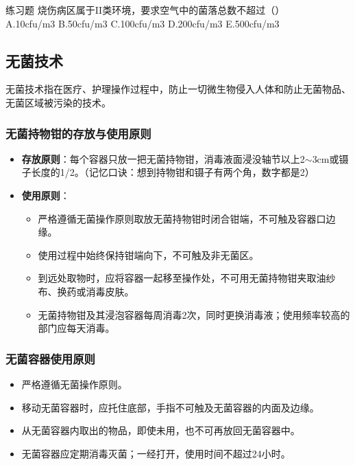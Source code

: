 \documentclass[11pt, a4paper]{ctexart}
\begin{document}
\begin{examplebox}{练习题}
	烧伤病区属于II类环境，要求空气中的菌落总数不超过（\qquad）\\
	A.10cfu/m3 \quad B.50cfu/m3 \quad C.100cfu/m3 \quad D.200cfu/m3 \quad E.500cfu/m3
\end{examplebox}

\subsection{无菌技术}
无菌技术指在医疗、护理操作过程中，防止一切微生物侵入人体和防止无菌物品、无菌区域被污染的技术。

\subsubsection{无菌持物钳的存放与使用原则}
\begin{itemize}
	\item \textbf{存放原则}：每个容器只放一把无菌持物钳，消毒液面浸没轴节以上2$\sim$3cm或镊子长度的1/2。（记忆口诀：想到持物钳和镊子有两个角，数字都是2）
	\item \textbf{使用原则}：
	      \begin{itemize}
		      \item 严格遵循无菌操作原则取放无菌持物钳时闭合钳端，不可触及容器口边缘。
		      \item 使用过程中始终保持钳端向下，不可触及非无菌区。
		      \item 到远处取物时，应将容器一起移至操作处，不可用无菌持物钳夹取油纱布、换药或消毒皮肤。
		      \item 无菌持物钳及其浸泡容器每周消毒2次，同时更换消毒液；使用频率较高的部门应每天消毒。
	      \end{itemize}
\end{itemize}

\subsubsection{无菌容器使用原则}
\begin{itemize}
	\item 严格遵循无菌操作原则。
	\item 移动无菌容器时，应托住底部，手指不可触及无菌容器的内面及边缘。
	\item 从无菌容器内取出的物品，即使未用，也不可再放回无菌容器中。
	\item 无菌容器应定期消毒灭菌；一经打开，使用时间不超过24小时。
\end{itemize}
\end{document}
